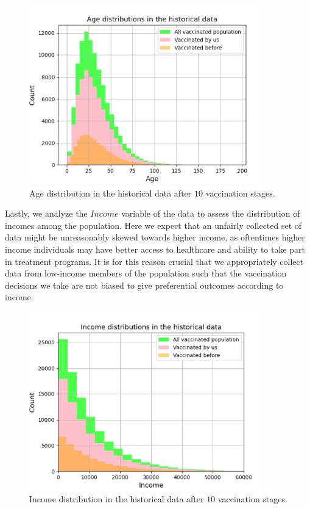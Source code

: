 \documentclass{article}
\begin{document}
\begin{figure}[H]
    \centering
    \includegraphics[width=10cm]{hd_age_dist_version2.png}
    \caption{Age distribution in the historical data after $10$ vaccination stages.}
    \label{hd_age_dist}
\end{figure}

Lastly, we analyze the $Income$ variable of the data to assess the distribution of incomes among the population. Here we expect that an unfairly collected set of data might be unreasonably skewed towards higher income, as oftentimes higher income individuals may have better access to healthcare and ability to take part in treatment programs. It is for this reason crucial that we appropriately collect data from low-income members of the population such that the vaccination decisions we take are not biased to give preferential outcomes according to income.

\begin{figure}[H]
    \centering
    \includegraphics[width=10cm]{hd_income_dist_version2.png}
    \caption{Income distribution in the historical data after $10$ vaccination stages.}
    \label{hd_income_dist}
\end{figure}
\end{document}
